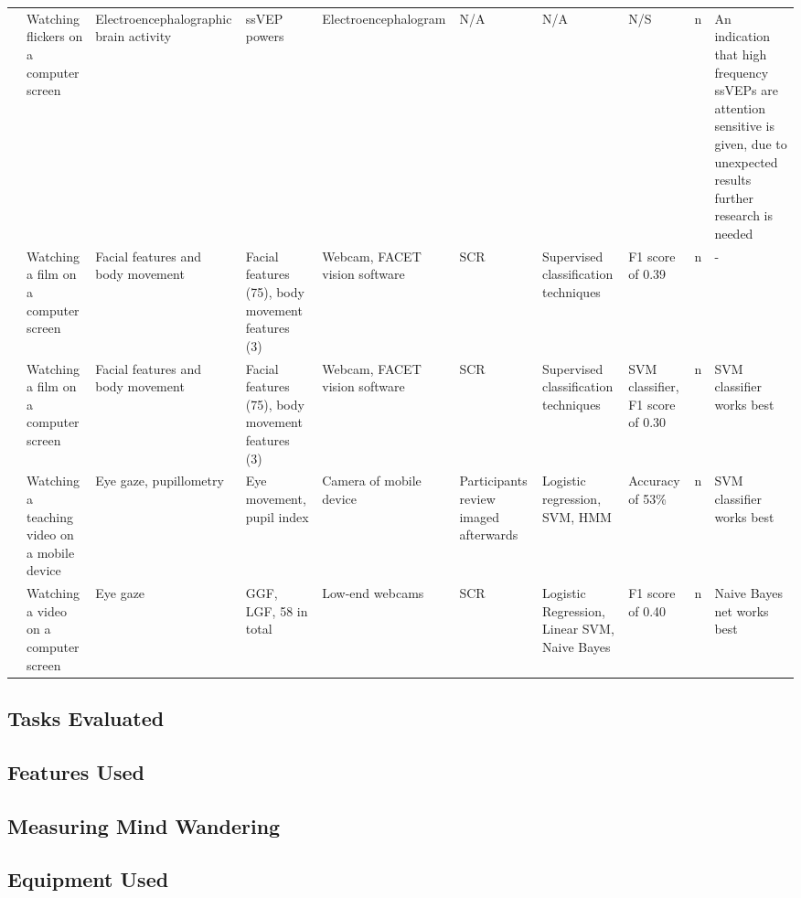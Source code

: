\begin{sidewaystable}
\begin{table}[H]
\begin{tabulary}{\textheight}{LLLLLLLLLL}
\cite{Russell2016MonitoringEnvironments} & Watching flickers on a computer screen & Electroencephalographic brain activity & ssVEP powers & Electroencephalogram & N/A & N/A & N/S & n & An indication that high frequency ssVEPs are attention sensitive is given, due to unexpected results further research is needed\\
\cite{Stewart2017FaceComprehension}     & Watching a film on a computer screen & Facial features and body movement & Facial features (75), body movement features (3) & Webcam, FACET vision software & SCR & Supervised classification techniques & F1 score of 0.39 & n & -\\
\cite{Stewart2016WheresViewing}         & Watching a film on a computer screen & Facial features and body movement & Facial features (75), body movement features (3) & Webcam, FACET vision software & SCR & Supervised classification techniques & SVM classifier, F1 score of 0.30 & n & SVM classifier works best\\
\cite{ISI:000443429900018}              & Watching a teaching video on a mobile device & Eye gaze, pupillometry & Eye movement, pupil index & Camera of mobile device & Participants review imaged afterwards & Logistic regression, SVM, HMM & Accuracy of 53\% & n & SVM classifier works best\\
\cite{Zhao2017ScalableApproach}         & Watching a video on a computer screen & Eye gaze & GGF, LGF, 58 in total & Low-end webcams & SCR & Logistic Regression, Linear SVM, Naive Bayes & F1 score of 0.40 & n & Naive Bayes net works best\\
\bottomrule
		\end{tabulary}

\end{table}
\end{sidewaystable}
\twocolumn

\subsection{Tasks Evaluated}

\subsection{Features Used}

\subsection{Measuring Mind Wandering}

\subsection{Equipment Used}
\lipsum